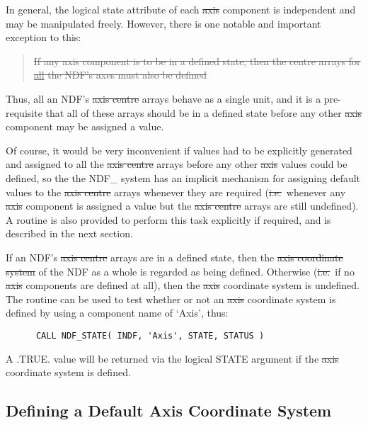 In general, the logical state attribute of each \st{axis\/} component is
independent and may be manipulated freely. 
However, there is one notable and important exception to this: 

\begin{quote}
\begin{center}
\st{If any \st{axis\/} component is to be in a defined state, then the
\st{centre\/} arrays for \underline{all} the NDF's \st{axes} must also be 
defined}
\end{center}
\end{quote}

Thus, all an NDF's \st{axis centre\/} arrays behave as a single unit, and
it is a pre-requisite that all of these arrays should be in a defined state
before any other \st{axis\/} component may be assigned a value. 

Of course, it would be very inconvenient if values had to be explicitly
generated and assigned to all the \st{axis centre\/} arrays before any
other \st{axis\/} values could be defined, so the the NDF\_ system has an
implicit mechanism for assigning default values to the \st{axis centre\/}
arrays whenever they are required (\st{i.e.}\ whenever any \st{axis\/}
component is assigned a value but the \st{axis centre\/} arrays are still
undefined). 
A routine is also provided to perform this task explicitly if required, and
is described in the next section. 

If an NDF's \st{axis centre\/} arrays are in a defined state, then the
\st{axis coordinate system\/} of the NDF as a whole is regarded as
being 
defined. 
Otherwise (\st{i.e.}\ if no \st{axis\/} components are defined at all),
then the \st{axis\/} coordinate system is undefined. 
The routine  can be used to test whether or not an \st{axis\/}
coordinate system is defined by using a component name of `Axis', thus: 

\small
\begin{verbatim}
      CALL NDF_STATE( INDF, 'Axis', STATE, STATUS )
\end{verbatim}
\normalsize

A .TRUE. value will be returned via the logical STATE argument if the
\st{axis\/} coordinate system is defined. 

\subsection{\label{ss:acre}Defining a Default Axis Coordinate System}

